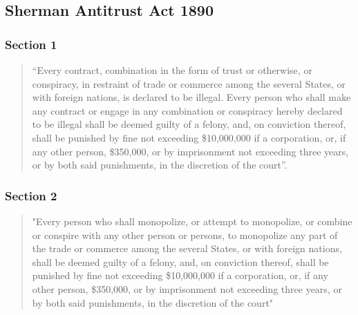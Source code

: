     \subsection{Sherman Antitrust Act 1890}

        \subsubsection{Section 1}
            \begin{quote}
                “Every contract, combination in the form of trust or otherwise, or conspiracy, in restraint of trade or commerce among the several States, or with foreign nations, is declared to be illegal. Every person who shall make any contract or engage in any combination or conspiracy hereby declared to be illegal shall be deemed guilty of a felony, and, on conviction thereof, shall be punished by fine not exceeding \$10,000,000 if a corporation, or, if any other person, \$350,000, or by imprisonment not exceeding three years, or by both said punishments, in the discretion of the court”.
            \end{quote}

        \subsubsection{Section 2}
            \begin{quote}
                "Every person who shall monopolize, or attempt to monopolize, or combine or conspire with any other person or persons, to monopolize any part of the trade or commerce among the several States, or with foreign nations, shall be deemed guilty of a felony, and, on conviction thereof, shall be punished by fine not exceeding \$10,000,000 if a corporation, or, if any other person, \$350,000, or by imprisonment not exceeding three years, or by both said punishments, in the discretion of the court"
            \end{quote}    


